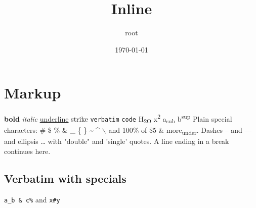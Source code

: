 \documentclass[11pt]{article}
\author{root}
\date{\today}
\title{Inline}
\begin{document}
\maketitle
\tableofcontents

\section{Markup}
\label{sec:orge749594}
\textbf{bold} \emph{italic} \uline{underline} \sout{strike} \texttt{verbatim} \texttt{code} H\textsubscript{2O} x\textsuperscript{2} a\textsubscript{sub} b\textsuperscript{sup}
Plain special characters: \# \$ \% \& \_ \{ \} \textasciitilde{} \^{} $\backslash$ and 100\% of \$5 \& more\textsubscript{under}.
Dashes -- and --- and ellipsis \ldots{} with "double" and 'single' quotes.
A line ending in a break\\[0pt]
continues here.
\subsection{Verbatim with specials}
\label{sec:orgb224614}
\texttt{a\_b \& c\%} and \texttt{x\#y}
\end{document}
